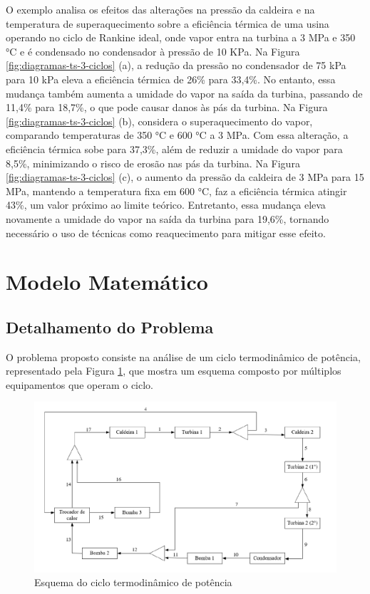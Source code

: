 \documentclass[
	article,			%
	11pt,				%
	oneside,			%
	a4paper,			%
	english,			%
	brazil,				%
	sumario=tradicional
	]{abntex2}
\begin{document}
O exemplo analisa os efeitos das alterações na pressão da caldeira e na temperatura de superaquecimento sobre a eficiência térmica de uma usina operando no ciclo de Rankine ideal, onde vapor entra na turbina a 3 MPa e 350 °C e é condensado no condensador à pressão de 10 KPa.
Na Figura \ref{fig:diagramas-ts-3-ciclos} (a), a redução da pressão no condensador de 75 kPa para 10 kPa eleva a eficiência térmica de 26\% para 33,4\%. No entanto, essa mudança também aumenta a umidade do vapor na saída da turbina, passando de 11,4\% para 18,7\%, o que pode causar danos às pás da turbina.
Na Figura \ref{fig:diagramas-ts-3-ciclos} (b), considera o superaquecimento do vapor, comparando temperaturas de 350 °C e 600 °C a 3 MPa. Com essa alteração, a eficiência térmica sobe para 37,3\%, além de reduzir a umidade do vapor para 8,5\%, minimizando o risco de erosão nas pás da turbina.
Na Figura \ref{fig:diagramas-ts-3-ciclos} (c), o aumento da pressão da caldeira de 3 MPa para 15 MPa, mantendo a temperatura fixa em 600 °C, faz a eficiência térmica atingir 43\%, um valor próximo ao limite teórico. Entretanto, essa mudança eleva novamente a umidade do vapor na saída da turbina para 19,6\%, tornando necessário o uso de técnicas como reaquecimento para mitigar esse efeito.

\section{Modelo Matemático}

\subsection{Detalhamento do Problema}

O problema proposto consiste na análise de um ciclo termodinâmico de potência, representado pela Figura \ref{fig:esquema-problema}, que mostra um esquema composto por múltiplos equipamentos que operam o ciclo.

\begin{figure}[h]
	\centering
	\includegraphics[width=1.0\textwidth]{./images/esquema-problema.png}
	\caption{Esquema do ciclo termodinâmico de potência}
	\label{fig:esquema-problema}
\end{figure}
\end{document}
